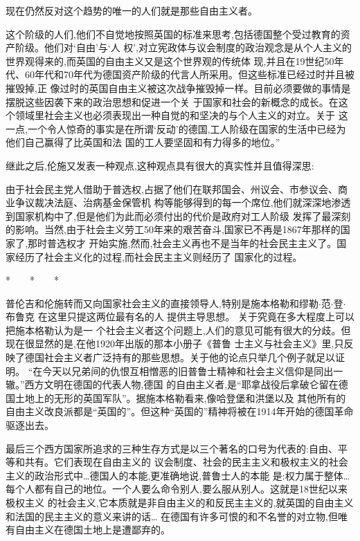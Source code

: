 ﻿\documentclass[12pt]{article}
\begin{document}
现在仍然反对这个趋势的唯一的人们就是那些自由主义者。

这个阶级的人们,他们不自觉地按照英国的标准来思考,包括德国整个受过教育的资产阶级。他们对‘自由’与‘人
权’,对立宪政体与议会制度的政治观念是从个人主义的世界观得来的,而英国的自由主义又是这个世界观的传统体
现,并且在19世纪50年代、60年代和70年代为德国资产阶级的代言人所采用。但这些标准已经过时并且被摧毁掉,正
像过时的英国自由主义被这次战争摧毁掉一样。目前必须要做的事情是摆脱这些因袭下来的政治思想和促进一个关
于国家和社会的新概念的成长。在这个领域里社会主义也必须表现出一种自觉的和坚决的与个人主义的对立。关于
这一点,一个令人惊奇的事实是在所谓‘反动’的德国,工人阶级在国家的生活中已经为他们自己赢得了比英国和法
国的工人要坚固和有力得多的地位。''

继此之后,伦施又发表一种观点,这种观点具有很大的真实性并且值得深思:

由于社会民主党人借助于普选权,占据了他们在联邦国会、州议会、市参议会、商业争议裁决法庭、治病基金保管机
构等能够得到的每一个席位,他们就深深地渗透到国家机构中了,但是他们为此而必须付出的代价是政府对工人阶级
发挥了最深刻的影响。当然,由于社会主义劳工50年来的艰苦奋斗,国家已不再是1867年那样的国家了,那时普选权才
开始实施,然而,社会主义再也不是当年的社会民主主义了。国家经历了社会主义化的过程,而社会民主主义则经历了
国家化的过程。

*　　*　　*

普伦吉和伦施转而又向国家社会主义的直接领导人,特别是施本格勒和缪勒$\cdot$范$\cdot$登$\cdot$布鲁克
\myrule 在这里只提这两位最有名的人 \myrule 提供主导思想。 关于究竟在多大程度上可以把施本格勒认为是一
个社会主义者这个问题上,人们的意见可能有很大的分歧。但现在很显然的是,在他1920年出版的那本小册子《普鲁
士主义与社会主义》里,只反映了德国社会主义者广泛持有的那些思想。关于他的论点只举几个例子就足以证明。
``在今天以兄弟间的仇恨互相憎恶的旧普鲁士精神和社会主义信仰是同出一辙。''西方文明在德国的代表人物,德国
的自由主义者,是``耶拿战役后拿破仑留在德国土地上的无形的英国军队''。据施本格勒看来,像哈登堡和洪堡以及
其他所有的自由主义改良派都是``英国的''。但这种``英国的''精神将被在1914年开始的德国革命驱逐出去。

最后三个西方国家所追求的三种生存方式是以三个著名的口号为代表的:自由、平等和共有。它们表现在自由主义的
议会制度、社会的民主主义和极权主义的社会主义的政治形式中\ldots 德国人的本能,更准确地说,普鲁士人的本能
是:权力属于整体\ldots 每个人都有自己的地位。一个人要么命令别人,要么服从别人。这就是18世纪以来极权主义
的社会主义,它本质就是非自由主义的和反民主主义的,就英国的自由主义和法国的民主主义的意义来讲的话\ldots
在德国有许多可恨的和不名誉的对立物,但唯有自由主义在德国土地上是遭鄙弃的。
\end{document}
